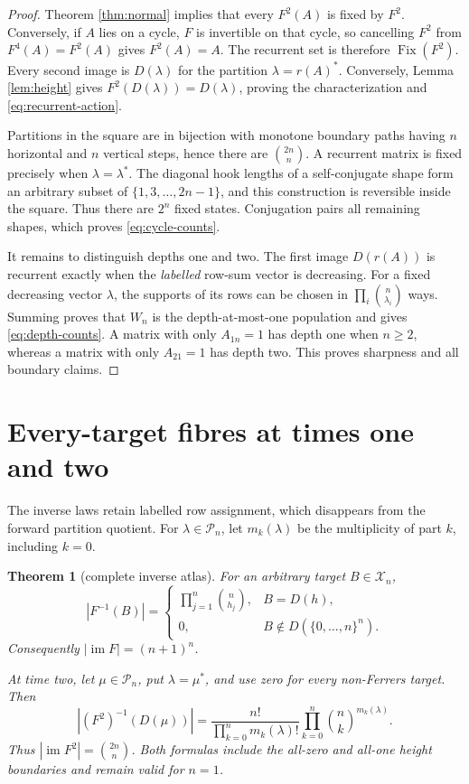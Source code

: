 \documentclass[a4paper,10pt]{amsart}
\newtheorem{theorem}{Theorem}
\theoremstyle{remark}
\newcommand{\X}{\mathcal X}
\newcommand{\Pbox}{\mathcal P}
\newcommand{\im}{\operatorname{im}}
\newcommand{\Fix}{\operatorname{Fix}}
\begin{document}
\begin{proof}
Theorem \ref{thm:normal} implies that every $F^2(A)$ is fixed by $F^2$.
Conversely, if $A$ lies on a cycle, $F$ is invertible on that cycle, so
cancelling $F^2$ from $F^4(A)=F^2(A)$ gives $F^2(A)=A$.  The recurrent set is
therefore $\Fix(F^2)$.  Every second image is $D(\lambda)$ for the partition
$\lambda=r(A)^*$.  Conversely, Lemma \ref{lem:height} gives
$F^2(D(\lambda))=D(\lambda)$, proving the characterization and
\eqref{eq:recurrent-action}.

Partitions in the square are in bijection with monotone boundary paths having
$n$ horizontal and $n$ vertical steps, hence there are $\binom{2n}{n}$.
A recurrent matrix is fixed precisely when $\lambda=\lambda^*$.  The diagonal
hook lengths of a self-conjugate shape form an arbitrary subset of
$\{1,3,\ldots,2n-1\}$, and this construction is reversible inside the square.
Thus there are $2^n$ fixed states.  Conjugation pairs all remaining shapes,
which proves \eqref{eq:cycle-counts}.

It remains to distinguish depths one and two.  The first image $D(r(A))$ is
recurrent exactly when the \emph{labelled} row-sum vector is decreasing.
For a fixed decreasing vector $\lambda$, the supports of its rows can be
chosen in $\prod_i\binom n{\lambda_i}$ ways.  Summing proves that $W_n$ is the
depth-at-most-one population and gives \eqref{eq:depth-counts}.  A matrix with
only $A_{1n}=1$ has depth one when $n\geq2$, whereas a matrix with only
$A_{21}=1$ has depth two.  This proves sharpness and all boundary claims.
\end{proof}

\section{Every-target fibres at times one and two}

The inverse laws retain labelled row assignment, which disappears from the
forward partition quotient.  For $\lambda\in\Pbox_n$, let $m_k(\lambda)$ be
the multiplicity of part $k$, including $k=0$.

\begin{theorem}[complete inverse atlas]\label{thm:fibres}
For an arbitrary target $B\in\X_n$,
\begin{equation}\label{eq:fibre-one}
 |F^{-1}(B)|=
 \begin{cases}
  \displaystyle\prod_{j=1}^n\binom n{h_j},&B=D(h),\\[3pt]
  0,&B\notin D(\{0,\ldots,n\}^n).
 \end{cases}
\end{equation}
Consequently $|\im F|=(n+1)^n$.

At time two, let $\mu\in\Pbox_n$, put $\lambda=\mu^*$, and use zero for every
non-Ferrers target.  Then
\begin{equation}\label{eq:fibre-two}
 |(F^2)^{-1}(D(\mu))|
 =\frac{n!}{\prod_{k=0}^n m_k(\lambda)!}
   \prod_{k=0}^n\binom nk^{m_k(\lambda)}.
\end{equation}
Thus $|\im F^2|=\binom{2n}{n}$.  Both formulas include the all-zero and
all-one height boundaries and remain valid for $n=1$.
\end{theorem}
\end{document}
